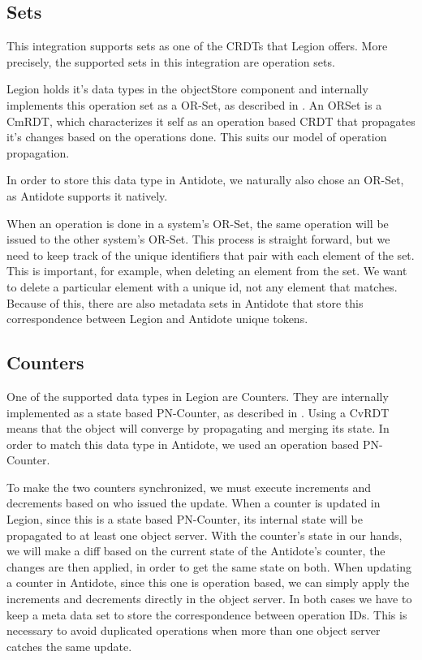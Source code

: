 \subsection{Sets}
\label{sec:sets}
This integration supports sets as one of the CRDTs that Legion offers. More precisely, the supported sets in this integration are operation sets.\par
	Legion holds it's data types in the objectStore component and internally implements this operation set as a OR-Set, as described in \cite{crdt}. An ORSet is a CmRDT, which characterizes it self as an operation based CRDT that propagates it's changes based on the operations done. This suits our model of operation propagation.\par
	In order to store this data type in Antidote, we naturally also chose an OR-Set, as Antidote supports it natively.\par
	When an operation is done in a system's OR-Set, the same operation will be issued to the other system's OR-Set. This process is straight forward, but we need to keep track of the unique identifiers that pair with each element of the set. This is important, for example, when deleting an element from the set. We want to delete a particular element with a unique id, not any element that matches. Because of this, there are also metadata sets in Antidote that store this correspondence between Legion and Antidote unique tokens.

\subsection{Counters}
\label{sec:counters}
One of the supported data types in Legion are Counters. They are internally implemented as a state based PN-Counter, as described in \cite{crdt}. Using a CvRDT means that the object will converge by propagating and merging its state. In order to match this data type in Antidote, we used an operation based PN-Counter.\par
	To make the two counters synchronized, we must execute increments and decrements based on who issued the update. When a counter is updated in Legion, since this is a state based PN-Counter, its internal state will be propagated to at least one object server. With the counter's state in our hands, we will make a diff based on the current state of the Antidote's counter, the changes are then applied, in order to get the same state on both. When updating a counter in Antidote, since this one is operation based, we can simply apply the increments and decrements directly in the object server. In both cases we have to keep a meta data set to store the correspondence between operation IDs. This is necessary to avoid duplicated operations when more than one object server catches the same update.

